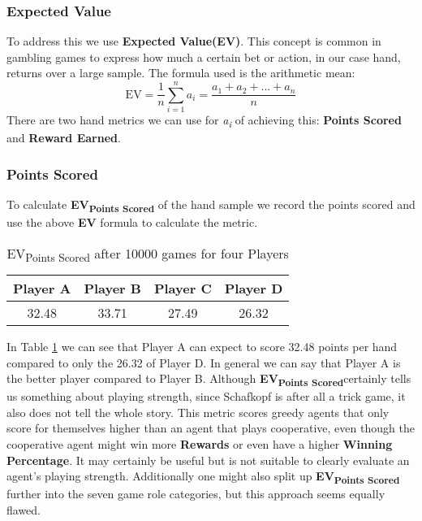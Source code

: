\subsubsection{Expected Value}
To address this we use \textbf{Expected Value(EV)}.
This concept is common in gambling games to express how much a certain bet or action, in our case hand, returns over
a large sample.
The formula used is the arithmetic mean:
\[ \text{EV} = \frac{1}{n} \sum_{i=1}^{n}a_{i} = \frac{a_{1} + a_{2} + ...+a_{n}}{n} \]
There are two hand metrics we can use for \textit{a\textsubscript{i}} of achieving this: \textbf{Points Scored} and
\textbf{Reward Earned}.
\subsubsection{Points Scored}
To calculate \textbf{EV\textsubscript{Points Scored}} of the hand sample we record the points scored and use the
above \textbf{EV} formula to calculate the metric.
\newline
\begin{table}[!h]
\centering
\begin{tabular}{cccc}
\toprule
Player A &  Player B &  Player C &  Player D\\
\midrule
32.48 & 33.71 & 27.49 & 26.32 \\
\bottomrule
\end{tabular}
\caption{EV\textsubscript{Points Scored} after 10000 games for four Players}
\label{tab:evscorestable}
\end{table}
\newline
In Table \ref{tab:evscorestable} we can see that Player A can expect to score 32.48 points per hand compared to only
the 26.32 of Player D.
In general we can say that Player A is the better player compared to Player B.
\newline
Although \textbf{EV\textsubscript{Points Scored}}certainly tells us something about playing strength, since Schafkopf
is after all a trick game, it also does not tell the whole story.
This metric scores greedy agents that only score for themselves higher than an agent that plays cooperative, even
though the cooperative agent might win more \textbf{Rewards} or even have a higher \textbf{Winning Percentage}.
\newline
It may certainly be useful but is not suitable to clearly evaluate an agent's playing strength.
Additionally one might also split up \textbf{EV\textsubscript{Points Scored}} further into the seven game role
categories, but this approach seems equally flawed.

